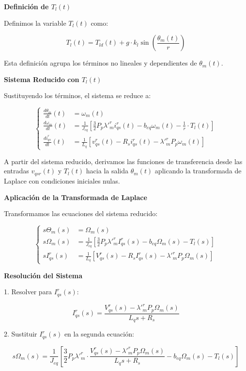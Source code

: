 \documentclass{article}
\begin{document}
\textbf{Definición de \( T_l(t) \)}

Definimos la variable \( T_l(t) \) como:

\[
T_l(t) = T_{ld}(t) + g \cdot k_l \sin\left(\frac{\theta_m(t)}{r}\right)
\]

Esta definición agrupa los términos no lineales y dependientes de \( \theta_m(t) \).

\textbf{Sistema Reducido con \( T_l(t) \)}

Sustituyendo los términos, el sistema se reduce a:

\[
\left\{
\begin{aligned}
\frac{d\theta_m}{dt}(t) &= \omega_m(t) \\[1ex]
\frac{d\omega_m}{dt}(t) &= \frac{1}{J_{eq}} \left[ \frac{3}{2} P_p \lambda'^r_m i^r_{qs}(t) - b_{eq} \omega_m(t) - \frac{1}{r}\cdot T_l(t) \right] \\[1ex]
\frac{di^r_{qs}}{dt}(t) &= \frac{1}{L_q} \left[ v^r_{qs}(t) - R_s i^r_{qs}(t) - \lambda'^r_m P_p \omega_m(t) \right]
\end{aligned}
\right.
\]


A partir del sistema reducido, derivamos las funciones de transferencia desde las entradas \( v_{qsr}(t) \) y \( T_l(t) \) hacia la salida \( \theta_m(t) \) aplicando la transformada de Laplace con condiciones iniciales nulas.

\textbf{Aplicación de la Transformada de Laplace}

Transformamos las ecuaciones del sistema reducido:

\[
\left\{
\begin{aligned}
s\Theta_m(s) &= \Omega_m(s) \\[1ex]
s\Omega_m(s) &= \frac{1}{J_{eq}} \left[ \frac{3}{2} P_p \lambda'^r_m I^r_{qs}(s) - b_{eq} \Omega_m(s) - T_l(s) \right] \\[1ex]
sI^r_{qs}(s) &= \frac{1}{L_q} \left[ V^r_{qs}(s) - R_s I^r_{qs}(s) - \lambda'^r_m P_p \Omega_m(s) \right]
\end{aligned}
\right.
\]

\textbf{Resolución del Sistema}

1. Resolver para \( I^r_{qs}(s) \):

\[
I^r_{qs}(s) = \frac{V^r_{qs}(s) - \lambda'^r_m P_p \Omega_m(s)}{L_q s + R_s}
\]

2. Sustituir \( I^r_{qs}(s) \) en la segunda ecuación:

\[
s\Omega_m(s) = \frac{1}{J_{eq}} \left[ \frac{3}{2} P_p \lambda'^r_m \cdot \frac{V^r_{qs}(s) - \lambda'^r_m P_p \Omega_m(s)}{L_q s + R_s} - b_{eq} \Omega_m(s) - T_l(s) \right]
\]
\end{document}
